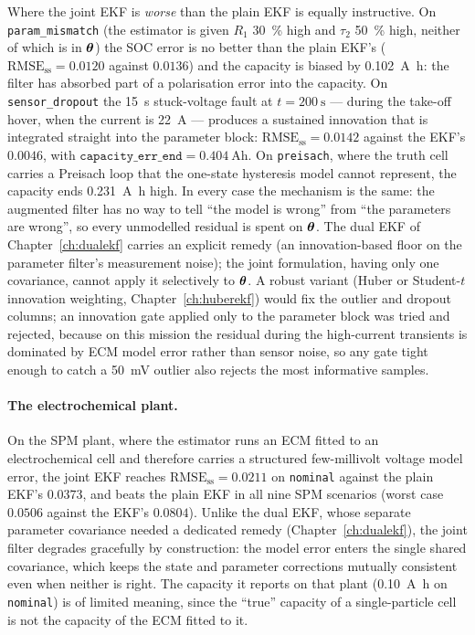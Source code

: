 Where the joint EKF is \emph{worse} than the plain EKF is equally instructive.  On
\texttt{param\_mismatch} (the estimator is given $R_1$ \SI{30}{\percent} high and $\tau_2$
\SI{50}{\percent} high, neither of which is in $\bm{\theta}$) the SOC error is no better than the plain
EKF's ($\text{RMSE}_\text{ss}=0.0120$ against $0.0136$) and the capacity is biased by
\SI{+0.102}{\ampere\hour}: the filter has absorbed part of a polarisation error into the capacity.
On \texttt{sensor\_dropout} the \SI{15}{\second} stuck-voltage fault at $t=\SI{200}{\second}$ ---
during the take-off hover, when the current is \SI{22}{\ampere} --- produces a sustained
innovation that is integrated straight into the parameter block:
$\text{RMSE}_\text{ss}=0.0142$ against the EKF's $0.0046$, with
$\texttt{capacity\_err\_end}=\SI{+0.404}{\ampere\hour}$.  On \texttt{preisach}, where the truth cell
carries a Preisach loop that the one-state hysteresis model cannot represent, the capacity ends
\SI{+0.231}{\ampere\hour} high.  In every case the mechanism is the same: the augmented
filter has no way to tell ``the model is wrong'' from ``the parameters are wrong'', so every
unmodelled residual is spent on $\bm{\theta}$.  The dual EKF of Chapter~\ref{ch:dualekf} carries an
explicit remedy (an innovation-based floor on the parameter filter's measurement noise); the joint
formulation, having only one covariance, cannot apply it selectively to $\bm{\theta}$.  A robust variant (Huber or Student-$t$ innovation
weighting, Chapter~\ref{ch:huberekf}) would fix the outlier and dropout columns; an innovation gate
applied only to the parameter block was tried and rejected, because on this mission the residual
during the high-current transients is dominated by ECM model error rather than sensor noise, so any
gate tight enough to catch a \SI{50}{\milli\volt} outlier also rejects the most informative
samples.

\paragraph{The electrochemical plant.}  On the SPM plant, where the estimator runs an ECM fitted to
an electrochemical cell and therefore carries a structured few-millivolt voltage model error, the
joint EKF reaches $\text{RMSE}_\text{ss}=0.0211$ on \texttt{nominal} against the plain EKF's
$0.0373$, and beats the plain EKF in all nine SPM scenarios (worst case $0.0506$ against the EKF's
$0.0804$).  Unlike the dual EKF, whose separate parameter covariance needed a dedicated remedy
(Chapter~\ref{ch:dualekf}), the joint filter degrades gracefully by construction: the model error
enters the single shared covariance, which keeps the state and parameter corrections mutually
consistent even when neither is right.  The capacity it reports on that plant
(\SI{+0.10}{\ampere\hour} on \texttt{nominal}) is of limited meaning, since the ``true'' capacity of
a single-particle cell is not the capacity of the ECM fitted to it.

